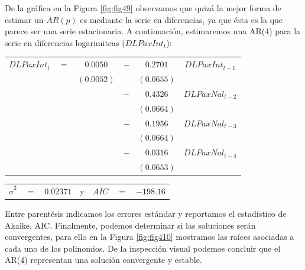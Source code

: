 \documentclass[
]{book}
\begin{document}
De la gráfica en la Figura \ref{fig:fig49} observamos que quizá la mejor forma de estimar un \(AR(p)\) es mediante la serie en diferencias, ya que ésta es la que parece ser una serie estacionaria. A continuación, estimaremos una AR(4) para la serie en diferencias logarimitcas (\(DLPaxInt_t\)):

\begin{center}
\begin{tabular}{ c c c c c c } 
    $DLPaxInt_t$ & $=$ & $0.0050$ & $-$ & $0.2701$  & $DLPaxInt_{t-1}$ \\ 
    &  & $(0.0052)$ &  & $(0.0655)$ & \\
    &  &  & $-$ & $0.4326$ & $DLPaxNal_{t-2}$ \\
    &  &  &  & $(0.0664)$ & \\
    &  &  & $-$ & $0.1956$ & $DLPaxNal_{t-3}$ \\
    &  &  &  & $(0.0664)$ & \\
    &  &  & $-$ & $0.0316$ & $DLPaxNal_{t-4}$ \\
    &  &  &  & $(0.0653)$ & 
\end{tabular}
\end{center}

\begin{center}
\begin{tabular}{ c c c c c c c } 
    $\hat{\sigma}^2$ & $=$ & $0.02371$ & y & $AIC$ & $=$ & $-198.16$ 
\end{tabular}
\end{center}

Entre parentésis indicamos los errores estándar y reportamos el estadístico de Akaike, AIC. Finalmente, podemos determinar si las
soluciones serán convergentes, para ello en la Figura \ref{fig:fig410} mostramos las raíces asociadas a cada uno de los polinomios. De la inspección visual podemos concluir que el AR(4) representan una solución convergente y estable.
\end{document}
